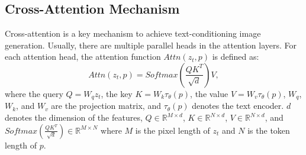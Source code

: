\subsection{Cross-Attention Mechanism}
\label{sec: attention}
Cross-attention is a key mechanism to achieve text-conditioning image generation. Usually, there are multiple parallel heads in the attention layers. For each attention head, the attention function $Attn(z_t, p)$ is defined as:
\begin{equation}
\label{eq: attention}
    Attn(z_t, p) = Softmax(\frac{QK^T}{\sqrt{d}})V,
\end{equation}
where the query $Q=W_qz_t$, the key $K=W_k\tau_\theta(p)$, the value $V=W_v\tau_\theta(p)$, $W_q$, $W_k$, and $W_v$ are the projection  matrix, and $\tau_\theta(p)$ denotes the text encoder. $d$ denotes the dimension of the features, $Q\in \mathbb{R}^{M\times d}$, $K\in \mathbb{R}^{N\times d}$, $V\in \mathbb{R}^{N\times d}$, and $Softmax(\frac{QK^T}{\sqrt{d}})\in\mathbb{R}^{M\times N}$ where $M$ is the pixel length of $z_t$ and $N$ is the token length of $p$.
